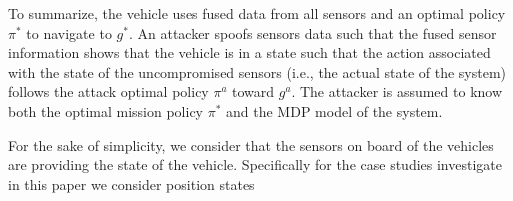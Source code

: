 \documentclass[letterpaper, 10 pt, conference]{ieeeconf}  %
\newcommand\NB[1]{$\spadesuit$\footnote{NB: #1}}
\begin{document}
To summarize, the vehicle uses fused data from all sensors and an optimal policy $\pi^*$ to navigate to $g^*$. An attacker spoofs sensors data such that the fused sensor information shows that the vehicle is in a state such that the action associated with the state of the uncompromised sensors (i.e., the actual state of the system) follows the attack optimal policy $\pi^a$ toward $g^a$. The attacker is assumed to know both the optimal mission policy $\pi^*$ and the MDP model of the system.   

For the sake of simplicity, we consider that the sensors on board of the vehicles are providing the state of the vehicle. Specifically for the case studies investigate in this paper we consider position states

\end{document}
